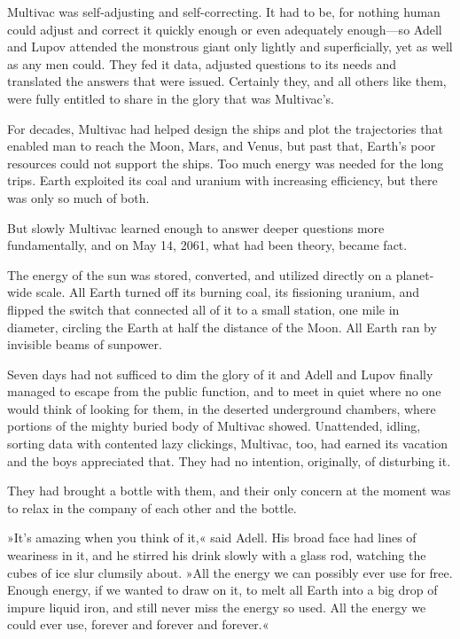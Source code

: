 \documentclass[11pt,twocolumn,paper=a5,pagesize]{article}
\newcommand{\q}[1]{»#1«}
\begin{document}
Multivac was self-adjusting and self-correcting. It had to be, for nothing 
human could adjust and correct it quickly enough or even adequately 
enough---so Adell and Lupov attended the monstrous giant only lightly and 
superficially, yet as well as any men could. They fed it data, adjusted 
questions to its needs and translated the answers that were issued. 
Certainly they, and all others like them, were fully entitled to share 
in the glory that was Multivac's.

For decades, Multivac had helped design the ships and plot the trajectories
that enabled man to reach the Moon, Mars, and Venus, but past that, 
Earth's poor resources could not support the ships. Too much energy was 
needed for the long trips. Earth exploited its coal and uranium with 
increasing efficiency, but there was only so much of both.

But slowly Multivac learned enough to answer deeper questions more 
fundamentally, and on May 14, 2061, what had been theory, became fact.

The energy of the sun was stored, converted, and utilized directly on a
planet-wide scale. All Earth turned off its burning coal, its 
fissioning uranium, and flipped the switch that connected all of it to
a small station, one mile in diameter, circling the Earth at half the 
distance of the Moon. All Earth ran by invisible beams of sunpower.

Seven days had not sufficed to dim the glory of it and Adell and Lupov 
finally managed to escape from the public function, and to meet in quiet 
where no one would think of looking for them, in the deserted underground 
chambers, where portions of the mighty buried body of Multivac showed. 
Unattended, idling, sorting data with contented lazy clickings, Multivac, 
too, had earned its vacation and the boys appreciated that. They had no 
intention, originally, of disturbing it.

They had brought a bottle with them, and their only concern at the moment 
was to relax in the company of each other and the bottle.

\q{It's amazing when you think of it,} said Adell. His broad face had lines 
of weariness in it, and he stirred his drink slowly with a glass rod, 
watching the cubes of ice slur clumsily about. 
\q{All the energy we can possibly ever use for free. Enough energy, if we 
wanted to draw on it, to melt all Earth into a big drop of impure liquid 
iron, and still never miss the energy so used. All the energy we could ever
use, forever and forever and forever.}
\end{document}
